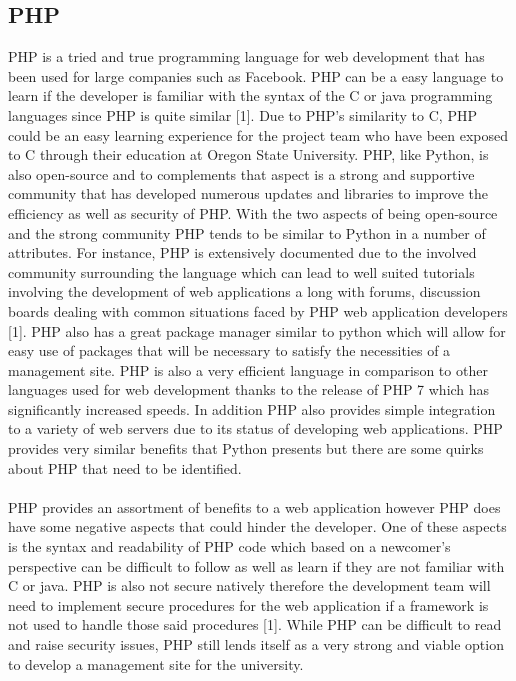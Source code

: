 \documentclass[onecolumn, draftclsnofoot,10pt, compsoc]{IEEEtran}
\begin{document}
\subsection{PHP}
PHP is a tried and true programming language for web development that has been used for large companies such as Facebook. PHP can be a easy language to learn if the developer is familiar with the syntax of the C or java programming languages since PHP is quite similar [1]. Due to PHP’s similarity to C, PHP could be an easy learning experience for the project team who have been exposed to C through their education at Oregon State University.  PHP, like Python, is also open-source and to complements that aspect is a strong and supportive community that has developed numerous updates and libraries to improve the efficiency as well as security of PHP. With the two aspects of being open-source and the strong community PHP tends to be similar to Python in a number of attributes. For instance, PHP is extensively documented due to the involved community surrounding the language which can lead to well suited tutorials involving the development of web applications a long with forums, discussion boards dealing with common situations faced by PHP web application developers [1]. PHP also has a great package manager similar to python which will allow for easy use of packages that will be necessary to satisfy the necessities of a management site. PHP is also a very efficient language in comparison to other languages used for web development thanks to the release of PHP 7 which has significantly increased speeds. In addition PHP also provides simple integration to a variety of web servers due to its status of developing web applications. PHP provides very similar benefits that Python presents but there are some quirks about PHP that need to be identified.\\
\\ 
\indent PHP provides an assortment of benefits to a web application however PHP does have some negative aspects that could hinder the developer. One of these aspects is the syntax and readability of PHP code which based on a newcomer’s perspective can be difficult to follow as well as learn if they are not familiar with C or java. PHP is also not secure natively therefore the development team will need to implement secure procedures for the web application if a framework is not used to handle those said procedures [1]. While PHP can be difficult to read and raise security issues, PHP still lends itself as a very strong and viable option to develop a management site for the university.   
\end{document}
